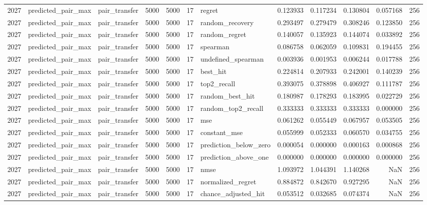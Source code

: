 \begin{tabular}{rllrrrlrrrrr}
2027 & predicted_pair_max & pair_transfer & 5000 & 5000 & 17 & regret & 0.123933 & 0.117234 & 0.130804 & 0.057168 & 256 \\
2027 & predicted_pair_max & pair_transfer & 5000 & 5000 & 17 & random_recovery & 0.293497 & 0.279479 & 0.308246 & 0.123850 & 256 \\
2027 & predicted_pair_max & pair_transfer & 5000 & 5000 & 17 & random_regret & 0.140057 & 0.135923 & 0.144074 & 0.033892 & 256 \\
2027 & predicted_pair_max & pair_transfer & 5000 & 5000 & 17 & spearman & 0.086758 & 0.062059 & 0.109831 & 0.194455 & 256 \\
2027 & predicted_pair_max & pair_transfer & 5000 & 5000 & 17 & undefined_spearman & 0.003936 & 0.001953 & 0.006244 & 0.017788 & 256 \\
2027 & predicted_pair_max & pair_transfer & 5000 & 5000 & 17 & best_hit & 0.224814 & 0.207933 & 0.242001 & 0.140239 & 256 \\
2027 & predicted_pair_max & pair_transfer & 5000 & 5000 & 17 & top2_recall & 0.393075 & 0.378898 & 0.406927 & 0.111787 & 256 \\
2027 & predicted_pair_max & pair_transfer & 5000 & 5000 & 17 & random_best_hit & 0.180987 & 0.178293 & 0.183995 & 0.022729 & 256 \\
2027 & predicted_pair_max & pair_transfer & 5000 & 5000 & 17 & random_top2_recall & 0.333333 & 0.333333 & 0.333333 & 0.000000 & 256 \\
2027 & predicted_pair_max & pair_transfer & 5000 & 5000 & 17 & mse & 0.061262 & 0.055449 & 0.067957 & 0.053505 & 256 \\
2027 & predicted_pair_max & pair_transfer & 5000 & 5000 & 17 & constant_mse & 0.055999 & 0.052333 & 0.060570 & 0.034755 & 256 \\
2027 & predicted_pair_max & pair_transfer & 5000 & 5000 & 17 & prediction_below_zero & 0.000054 & 0.000000 & 0.000163 & 0.000868 & 256 \\
2027 & predicted_pair_max & pair_transfer & 5000 & 5000 & 17 & prediction_above_one & 0.000000 & 0.000000 & 0.000000 & 0.000000 & 256 \\
2027 & predicted_pair_max & pair_transfer & 5000 & 5000 & 17 & nmse & 1.093972 & 1.044391 & 1.140268 & NaN & 256 \\
2027 & predicted_pair_max & pair_transfer & 5000 & 5000 & 17 & normalized_regret & 0.884872 & 0.842670 & 0.927295 & NaN & 256 \\
2027 & predicted_pair_max & pair_transfer & 5000 & 5000 & 17 & chance_adjusted_hit & 0.053512 & 0.032685 & 0.074374 & NaN & 256 \\

\end{tabular}
